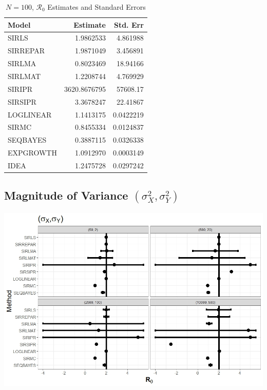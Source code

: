 \documentclass[12pt]{article}
\newcommand{\rr}{\ensuremath{\mathcal{R}_0}}
\begin{document}
\begin{table}[H]
	
	\centering
	\begin{tabular}[t]{l|r|r}
		\hline
		Model & Estimate & Std. Err\\
		\hline
		SIRLS & 1.9862533 & 4.861988\\
		\hline
		SIRREPAR & 1.9871049 & 3.456891\\
		\hline
		SIRLMA & 0.8023469 & 18.94166\\
		\hline
		SIRLMAT & 1.2208744 & 4.769929\\
		\hline
		SIRIPR & 3620.8676795 & 57608.17\\
		\hline
		SIRSIPR & 3.3678247 & 22.41867\\
		\hline
		LOGLINEAR & 1.1413175 & 0.0422219\\
		\hline
		SIRMC & 0.8455334 & 0.0124837\\
		\hline
		SEQBAYES & 0.3887115 & 0.0326338\\
		\hline
		EXPGROWTH & 1.0912970 & 0.0003149\\
		\hline
		IDEA & 1.2475728 & 0.0297242\\
		\hline
	\end{tabular}
\caption{$N = 100$, $\rr$ Estimates and Standard Errors}\label{tab:n2-res2}
\end{table}

\subsection{Magnitude of Variance $(\sigma^2_X, \sigma^2_Y)$}\label{sec:res-var}

\begin{center}
	\includegraphics[scale=0.5]{images/var.jpeg}
\end{center}
\end{document}
